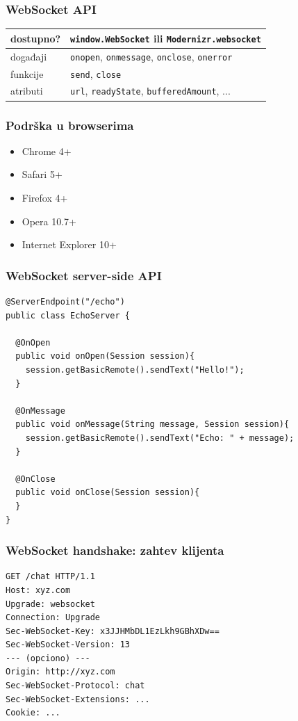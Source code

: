 \documentclass[compress]{beamer}
\begin{document}
\begin{frame}
  \frametitle{WebSocket API}
\begin{center}
\begin{tabular}{l|l}
dostupno? & \texttt{window.WebSocket} ili \texttt{Modernizr.websocket} \\ \hline
događaji & \texttt{onopen}, \texttt{onmessage}, \texttt{onclose}, \texttt{onerror} \\ \hline
funkcije & \texttt{send}, \texttt{close} \\ \hline
atributi & \texttt{url}, \texttt{readyState}, \texttt{bufferedAmount}, ... \\ \hline
\end{tabular}
\end{center}
\end{frame}

\begin{frame}
  \frametitle{Podrška u browserima}
  \begin{itemize}
    \item Chrome 4+
    \item Safari 5+
    \item Firefox 4+
    \item Opera 10.7+
    \item Internet Explorer 10+
  \end{itemize}
\end{frame}

\begin{frame}[fragile,shrink=10]
  \frametitle{WebSocket server-side API}
\begin{verbatim}
@ServerEndpoint("/echo") 
public class EchoServer {

  @OnOpen
  public void onOpen(Session session){
    session.getBasicRemote().sendText("Hello!");
  }
 
  @OnMessage
  public void onMessage(String message, Session session){
    session.getBasicRemote().sendText("Echo: " + message);
  }

  @OnClose
  public void onClose(Session session){
  }
}
\end{verbatim}
\end{frame}

\begin{frame}[fragile]
  \frametitle{WebSocket handshake: zahtev klijenta}
\begin{verbatim}
GET /chat HTTP/1.1
Host: xyz.com
Upgrade: websocket
Connection: Upgrade
Sec-WebSocket-Key: x3JJHMbDL1EzLkh9GBhXDw==
Sec-WebSocket-Version: 13
--- (opciono) ---
Origin: http://xyz.com
Sec-WebSocket-Protocol: chat
Sec-WebSocket-Extensions: ...
Cookie: ...
\end{verbatim}
\end{frame}
\end{document}
